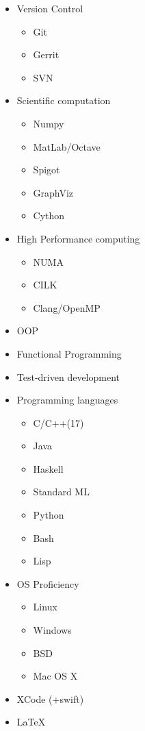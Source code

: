 \documentclass{article}
\begin{document}
\begin{multicols}{4}
  
  \begin{itemize}[topsep=0pt]
    \setlength{\itemsep}{-0.3em}
  \item Version Control
    \begin{itemize}[topsep=0pt, partopsep=0pt]
      \setlength{\itemsep}{-0.3em}
    \item Git
    \item Gerrit
    \item SVN
    \end{itemize}
  \item Scientific computation
    \begin{itemize}[topsep=0pt, partopsep=0pt]
      \setlength{\itemsep}{-0.3em}
    \item Numpy
    \item MatLab/Octave
    \item Spigot
    \item GraphViz
    \item Cython
    \end{itemize}
  \item High Performance computing
    \begin{itemize}[topsep=0pt, partopsep=0pt]
      \setlength{\itemsep}{-0.3em}
    \item NUMA
    \item CILK
    \item Clang/OpenMP
    \end{itemize}
  \item OOP
  \item Functional Programming
  \item Test-driven development 
  \item Programming languages
    \begin{itemize}[topsep=0pt, partopsep=0pt]
      \setlength{\itemsep}{-0.3em}
    \item C/C++(17)
    \item Java
    \item Haskell
    \item Standard ML
    \item Python
    \item Bash
    \item Lisp
    \end{itemize}
  \item OS Proficiency
    \begin{itemize}[topsep=0pt, partopsep=0pt]
      \setlength{\itemsep}{-0.3em}
    \item Linux
    \item Windows
    \item BSD
    \item Mac OS X
    \end{itemize}
    \item XCode (+swift)
    \item \LaTeX{}
  \end{itemize}
  
\end{multicols}
\end{document}
